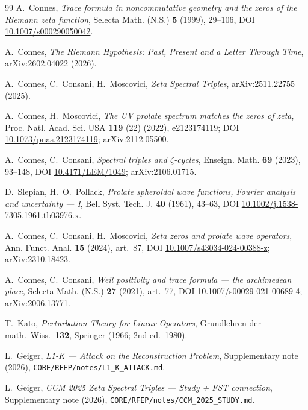 \documentclass[11pt,a4paper]{article}
\theoremstyle{plain}
\theoremstyle{definition}
\begin{document}
\begin{thebibliography}{99}
A.~Connes,
\textit{Trace formula in noncommutative geometry and the zeros of
the Riemann zeta function},
Selecta Math. (N.S.) \textbf{5} (1999), 29--106,
DOI \href{https://doi.org/10.1007/s000290050042}{10.1007/s000290050042}.

A.~Connes,
\textit{The Riemann Hypothesis: Past, Present and a Letter Through Time},
arXiv:2602.04022 (2026).

A.~Connes, C.~Consani, H.~Moscovici,
\textit{Zeta Spectral Triples},
arXiv:2511.22755 (2025).

A.~Connes, H.~Moscovici,
\textit{The UV prolate spectrum matches the zeros of zeta},
Proc. Natl. Acad. Sci. USA \textbf{119} (22) (2022), e2123174119;
DOI \href{https://doi.org/10.1073/pnas.2123174119}{10.1073/pnas.2123174119};
arXiv:2112.05500.

A.~Connes, C.~Consani,
\textit{Spectral triples and $\zeta$-cycles},
Enseign. Math. \textbf{69} (2023), 93--148,
DOI \href{https://doi.org/10.4171/LEM/1049}{10.4171/LEM/1049};
arXiv:2106.01715.

D.~Slepian, H.~O.~Pollack,
\textit{Prolate spheroidal wave functions, Fourier analysis and
uncertainty --- I},
Bell Syst. Tech. J. \textbf{40} (1961), 43--63,
DOI \href{https://doi.org/10.1002/j.1538-7305.1961.tb03976.x}{10.1002/j.1538-7305.1961.tb03976.x}.

A.~Connes, C.~Consani, H.~Moscovici,
\textit{Zeta zeros and prolate wave operators},
Ann. Funct. Anal. \textbf{15} (2024), art.~87,
DOI \href{https://doi.org/10.1007/s43034-024-00388-z}{10.1007/s43034-024-00388-z};
arXiv:2310.18423.

A.~Connes, C.~Consani,
\textit{Weil positivity and trace formula --- the archimedean place},
Selecta Math. (N.S.) \textbf{27} (2021), art.~77,
DOI \href{https://doi.org/10.1007/s00029-021-00689-4}{10.1007/s00029-021-00689-4};
arXiv:2006.13771.

T.~Kato,
\textit{Perturbation Theory for Linear Operators},
Grundlehren der math.\ Wiss.\ \textbf{132}, Springer (1966; 2nd ed.\ 1980).

L.~Geiger,
\textit{L1-K --- Attack on the Reconstruction Problem},
Supplementary note (2026),
\texttt{CORE/RFEP/notes/L1\_K\_ATTACK.md}.

L.~Geiger,
\textit{CCM 2025 Zeta Spectral Triples --- Study + FST connection},
Supplementary note (2026),
\texttt{CORE/RFEP/notes/CCM\_2025\_STUDY.md}.


\end{thebibliography}
\end{document}
